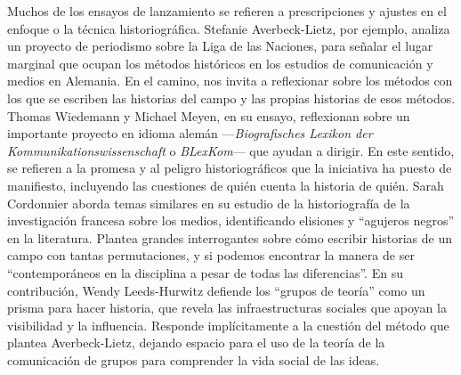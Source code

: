 \documentclass{tufte-handout}
\begin{document}
Muchos de los ensayos de lanzamiento se refieren a prescripciones y
ajustes en el enfoque o la técnica historiográfica. Stefanie
Averbeck-Lietz, por ejemplo, analiza un proyecto de periodismo sobre la
Liga de las Naciones, para señalar el lugar marginal que ocupan los
métodos históricos en los estudios de comunicación y medios en Alemania.
En el camino, nos invita a reflexionar sobre los métodos con los que se
escriben las historias del campo y las propias historias de esos
métodos. Thomas Wiedemann y Michael Meyen, en su ensayo, reflexionan
sobre un importante proyecto en idioma alemán ---\emph{Biografisches
Lexikon der Kommunikationswissenschaft} o \emph{BLexKom}--- que ayudan a
dirigir. En este sentido, se refieren a la promesa y al peligro
historiográficos que la iniciativa ha puesto de manifiesto, incluyendo
las cuestiones de quién cuenta la historia de quién. Sarah Cordonnier
aborda temas similares en su estudio de la historiografía de la
investigación francesa sobre los medios, identificando elisiones y
``agujeros negros'' en la literatura. Plantea grandes interrogantes
sobre cómo escribir historias de un campo con tantas permutaciones, y si
podemos encontrar la manera de ser ``contemporáneos en la disciplina a
pesar de todas las diferencias''. En su contribución, Wendy
Leeds-Hurwitz defiende los ``grupos de teoría'' como un prisma para
hacer historia, que revela las infraestructuras sociales que apoyan la
visibilidad y la influencia. Responde implícitamente a la cuestión del
método que plantea Averbeck-Lietz, dejando espacio para el uso de la
teoría de la comunicación de grupos para comprender la vida social de
las ideas.
\end{document}
